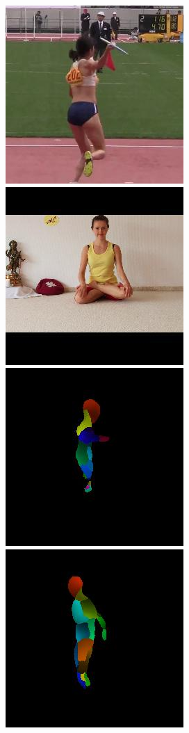 \begin{figure}[t!]
    \hfill
    \includegraphics[height=\flowhh]{resources/Human_Poses/pose/qualitative/view/view_img_10}
    \hfill
    \includegraphics[height=\flowhh]{resources/Human_Poses/pose/qualitative/view/view_img_127}
    \\
    \includegraphics[height=\flowhh]{resources/Human_Poses/pose/qualitative/view/view_iuv_00}
    \hfill
    \includegraphics[height=\flowhh]{resources/Human_Poses/pose/qualitative/view/view_iuv_02}

\end{figure}
